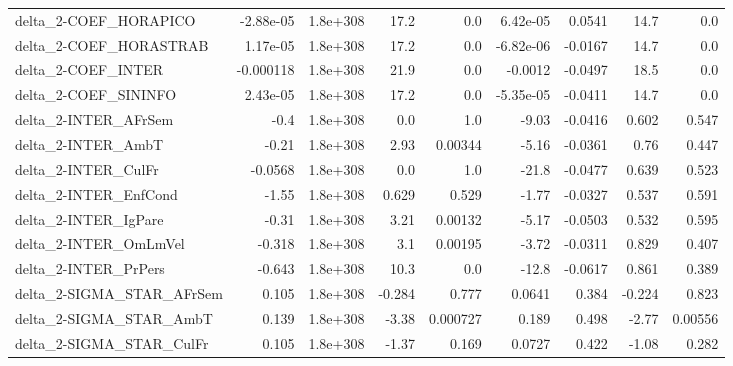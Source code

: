 \begin{tabular}{lrrrrrrrr}
delta\_2-COEF\_HORAPICO                 &   -2.88e-05 &     1.8e+308 &    17.2 &      0.0 &   6.42e-05 &      0.0541 &         14.7 &           0.0 \\
delta\_2-COEF\_HORASTRAB                &    1.17e-05 &     1.8e+308 &    17.2 &      0.0 &  -6.82e-06 &     -0.0167 &         14.7 &           0.0 \\
delta\_2-COEF\_INTER                    &   -0.000118 &     1.8e+308 &    21.9 &      0.0 &    -0.0012 &     -0.0497 &         18.5 &           0.0 \\
delta\_2-COEF\_SININFO                  &    2.43e-05 &     1.8e+308 &    17.2 &      0.0 &  -5.35e-05 &     -0.0411 &         14.7 &           0.0 \\
delta\_2-INTER\_AFrSem                  &        -0.4 &     1.8e+308 &     0.0 &      1.0 &      -9.03 &     -0.0416 &        0.602 &         0.547 \\
delta\_2-INTER\_AmbT                    &       -0.21 &     1.8e+308 &    2.93 &  0.00344 &      -5.16 &     -0.0361 &         0.76 &         0.447 \\
delta\_2-INTER\_CulFr                   &     -0.0568 &     1.8e+308 &     0.0 &      1.0 &      -21.8 &     -0.0477 &        0.639 &         0.523 \\
delta\_2-INTER\_EnfCond                 &       -1.55 &     1.8e+308 &   0.629 &    0.529 &      -1.77 &     -0.0327 &        0.537 &         0.591 \\
delta\_2-INTER\_IgPare                  &       -0.31 &     1.8e+308 &    3.21 &  0.00132 &      -5.17 &     -0.0503 &        0.532 &         0.595 \\
delta\_2-INTER\_OmLmVel                 &      -0.318 &     1.8e+308 &     3.1 &  0.00195 &      -3.72 &     -0.0311 &        0.829 &         0.407 \\
delta\_2-INTER\_PrPers                  &      -0.643 &     1.8e+308 &    10.3 &      0.0 &      -12.8 &     -0.0617 &        0.861 &         0.389 \\
delta\_2-SIGMA\_STAR\_AFrSem             &       0.105 &     1.8e+308 &  -0.284 &    0.777 &     0.0641 &       0.384 &       -0.224 &         0.823 \\
delta\_2-SIGMA\_STAR\_AmbT               &       0.139 &     1.8e+308 &   -3.38 & 0.000727 &      0.189 &       0.498 &        -2.77 &       0.00556 \\
delta\_2-SIGMA\_STAR\_CulFr              &       0.105 &     1.8e+308 &   -1.37 &    0.169 &     0.0727 &       0.422 &        -1.08 &         0.282 \\

\end{tabular}
